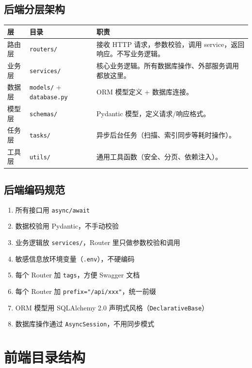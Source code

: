 \documentclass[11pt,a4paper]{article}
\begin{document}
\subsection{后端分层架构}

\begin{table}[h]
\centering
\begin{tabularx}{\linewidth}{lp{2.5cm}X}
\toprule
\textbf{层} & \textbf{目录} & \textbf{职责} \\
\midrule
路由层 & \texttt{routers/} & 接收 HTTP 请求，参数校验，调用 service，返回响应。不写业务逻辑。 \\
业务层 & \texttt{services/} & 核心业务逻辑。所有数据库操作、外部服务调用都放这里。 \\
数据层 & \texttt{models/} + \texttt{database.py} & ORM 模型定义 + 数据库连接。 \\
模型层 & \texttt{schemas/} & Pydantic 模型，定义请求/响应格式。 \\
任务层 & \texttt{tasks/} & 异步后台任务（扫描、索引同步等耗时操作）。 \\
工具层 & \texttt{utils/} & 通用工具函数（安全、分页、依赖注入）。 \\
\bottomrule
\end{tabularx}
\end{table}

\subsection{后端编码规范}

\begin{enumerate}[nosep]
  \item 所有接口用 \texttt{async/await}
  \item 数据校验用 Pydantic，不手动校验
  \item 业务逻辑放 \texttt{services/}，Router 里只做参数校验和调用
  \item 敏感信息放环境变量（\texttt{.env}），不硬编码
  \item 每个 Router 加 \texttt{tags}，方便 Swagger 文档
  \item 每个 Router 加 \texttt{prefix="/api/xxx"}，统一前缀
  \item ORM 模型用 SQLAlchemy 2.0 声明式风格（\texttt{DeclarativeBase}）
  \item 数据库操作通过 \texttt{AsyncSession}，不用同步模式
\end{enumerate}

\section{前端目录结构}
\end{document}
